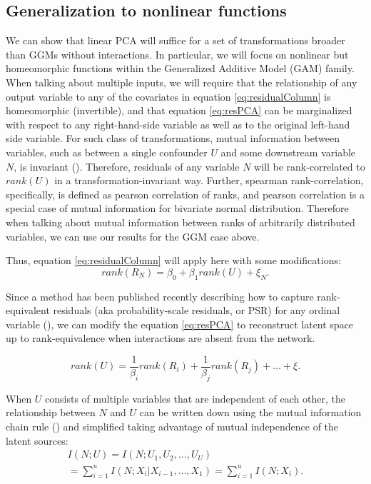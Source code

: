 \documentclass{article}
\begin{document}
\subsection{Generalization to nonlinear functions}
We can show that linear PCA will suffice for a set of transformations broader than GGMs without interactions.  In particular, we will focus on nonlinear but homeomorphic functions within the Generalized Additive Model (GAM) family.  When talking about multiple inputs, we will require that the relationship of any output variable to any of the covariates in equation \ref{eq:residualColumn} is homeomorphic (invertible), and that equation \ref{eq:resPCA} can be marginalized with respect to any right-hand-side variable as well as to the original left-hand side variable.  For such class of transformations, mutual information between variables, such as between a single confounder $U$ and some downstream variable $N$, is invariant (\cite{kraskov_estimating_2004}).  Therefore, residuals of any variable $N$ will be rank-correlated to $rank(U)$ in a transformation-invariant way. Further, spearman rank-correlation, specifically, is defined as pearson correlation of ranks, and pearson correlation is a special case of mutual information for bivariate normal distribution.  Therefore when talking about mutual information between ranks of arbitrarily distributed variables, we can use our results for the GGM case above.

Thus, equation \ref{eq:residualColumn} will apply here with some modifications:
\begin{equation}
rank(R_N) = \beta_0 + \beta_1 rank(U) + \xi_N.
\label{eq:residualColumnRank}
\end{equation}

Since a method has been published recently describing how to capture rank-equivalent residuals (aka probability-scale residuals, or PSR) for any ordinal variable (\cite{shepherd_probability-scale_2016}), we can modify the equation \ref{eq:resPCA} to reconstruct latent space up to rank-equivalence when interactions are absent from the network.

\begin{equation}
rank(U) = \frac{1}{\beta_i} rank(R_i) + \frac{1}{\beta_j} rank(R_j) + \dots + \xi. 
\label{resPcaGam}
\end{equation}

When $U$ consists of multiple variables that are independent of each other, the relationship between $N$ and $U$ can be written down using the mutual information chain rule (\cite{mackay_information_2003}) and simplified taking advantage of mutual independence of the latent sources:
\begin{equation}
\label{eq:rankSetRelationship}
\begin{split}
I(N; U) = I(N; U_1, U_2, \dots, U_U) \\= \sum_{i=1}^{u}{I(N; X_i | X_{i-1}, \dots, X_1)} = \sum_{i=1}^{u}{I(N; X_i)}.
\end{split}
\end{equation}
\end{document}

